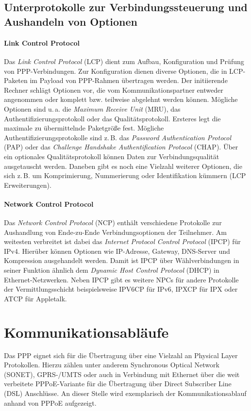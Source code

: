 \documentclass[journal,11pt]{IEEEtran}
\begin{document}
\subsection{Unterprotokolle zur Verbindungssteuerung und Aushandeln von Optionen}
\paragraph{Link Control Protocol}
Das \textit{Link Control Protocol} (LCP) dient zum Aufbau, Konfiguration und Prüfung von PPP-Verbindungen. Zur Konfiguration dienen diverse Optionen, die in LCP-Paketen im Payload von PPP-Rahmen übertragen werden. Der initiierende Rechner schlägt Optionen vor, die vom Kommunikationspartner entweder angenommen oder komplett bzw. teilweise abgelehnt werden können. Mögliche Optionen sind u.\,a. die \textit{Maximum Receive Unit} (MRU), das Authentifizierungsprotokoll oder das Qualitätsprotokoll. Ersteres legt die maximale zu übermittelnde Paketgröße fest. Mögliche Authentifizierungsprotokolle sind z.\,B. das \textit{Password Authentication Protocol} (PAP) oder das \textit{Challenge Handshake Authentification Protocol} (CHAP). Über ein optionales Qualitätsprotokoll können Daten zur Verbindungsqualität ausgetauscht werden. Daneben gibt es noch eine Vielzahl weiterer Optionen, die sich z.\,B. um Komprimierung, Nummerierung oder Identifikation kümmern (LCP Erweiterungen).
\paragraph{Network Control Protocol}
Das \textit{Network Control Protocol} (NCP) enthält verschiedene Protokolle zur Aushandlung von Ende-zu-Ende Verbindungsoptionen der Teilnehmer. Am weitesten verbreitet ist dabei das \textit{Internet Protocol Control Protocol} (IPCP) für IPv4. Hierüber können Optionen wie IP-Adresse, Gateway, DNS-Server und Kompression ausgehandelt werden. Damit ist IPCP über Wählverbindungen in seiner Funktion ähnlich dem \textit{Dynamic Host Control Protocol} (DHCP) in Ethernet-Netzwerken.
Neben IPCP gibt es weitere NPCs für andere Protokolle der Vermittlungsschicht beispielsweise IPV6CP für IPv6, IPXCP für IPX oder ATCP für Appletalk.


\section{Kommunikationsabläufe}
Das PPP eignet sich für die Übertragung über eine Vielzahl an Physical Layer Protokollen.
Hierzu zählen unter anderem  Synchronous Optical Network (SONET), GPRS-/UMTS oder auch
in Verbindung mit Ethernet über die weit verbeitete PPPoE-Variante für die Übertragung
über Direct Subscriber Line (DSL) Anschlüsse\cite{IEEEhowto:kopka}.
An dieser Stelle wird exemplarisch der Kommunikationsablauf anhand von PPPoE aufgezeigt.
\end{document}
